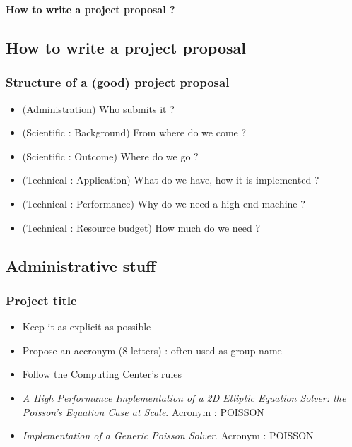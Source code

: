 \begin{frame}[containsverbatim]
\begin{center}
\textbf{How to write a project proposal ?}
\end{center}
\end{frame}

\subsection{How to write a project proposal}

\begin{frame}[containsverbatim]
	\frametitle{Structure of a (good) project proposal}	

\begin{itemize}
	\item{(Administration) Who submits it ?}
	\item{(Scientific : Background) From where do we come ?}
	\item{(Scientific : Outcome) Where do we go ?}
	\item{(Technical : Application) What do we  have, how it is implemented ?}
	\item{(Technical : Performance) Why do we need a high-end machine ?}
	\item{(Technical : Resource budget) How much do we need ?}
\end{itemize}

\end{frame}



\subsection{Administrative stuff}

\begin{frame}[containsverbatim]
	\frametitle{Project title}

\begin{itemize}
	\item {Keep it as explicit as possible}
	\item {Propose an accronym (8 letters) : often used as group name}
	\item {Follow the Computing Center's rules}
	\item{\textcolor{dkgreen}{\textit{A High Performance Implementation of a 2D Elliptic Equation Solver: the Poisson's Equation Case at Scale}. Acronym : POISSON} }
	\item{\textcolor{dkred}{\textit{Implementation of a Generic Poisson Solver}. Acronym : POISSON} }
\end{itemize}


\end{frame}



